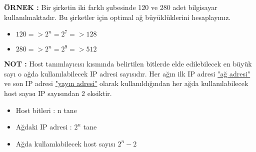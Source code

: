 \textbf{ÖRNEK : }Bir şirketin iki farklı şubesinde 120 ve 280 adet bilgisayar kullanılmaktadır. Bu şirketler için optimal ağ büyüklüklerini hesaplayınız. 

\begin{itemize}
\item[]$120 => 2^n = 2^7 => 128$
\item[]$280 => 2^n = 2^9 => 512$
\end{itemize}

\textbf{NOT : }Host tanımlayıcısı kısmında belirtilen bitlerde elde edilebilecek en büyük sayı o ağda kullanılabilecek IP adresi sayısıdır. Her ağın ilk IP adresi \underline{"ağ adresi"} ve son IP adresi \underline{"yayın adresi"} olarak kullanıldığından her ağda kullanılabilecek host sayısı IP sayısından 2 eksiktir.
\begin{itemize}
\item[] Host bitleri : n tane 
\item[] Ağdaki IP adresi : $2^n$ tane 
\item[] Ağda kullanılabilecek host sayısı $2^n-2$
\end{itemize}























